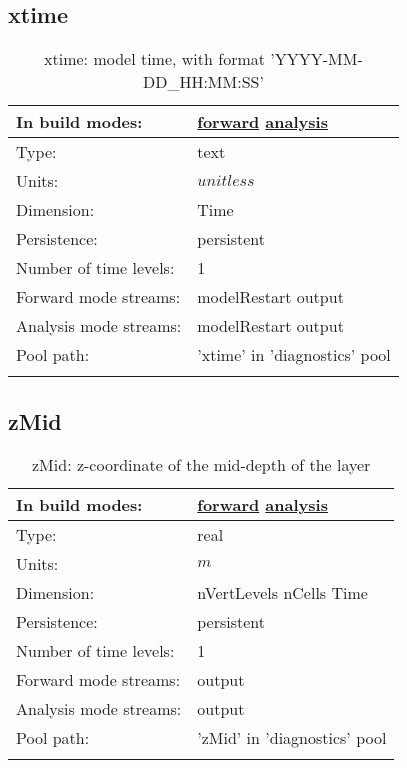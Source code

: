 \subsection[xtime]{xtime}
\label{subsec:var_sec_diagnostics_xtime}
\begin{center}
\begin{longtable}{| p{2.0in} | p{4.0in} |}
        \hline 
        In build modes: & \hyperref[subsec:forward_var_tab_diagnostics]{forward} \hyperref[subsec:analysis_var_tab_diagnostics]{analysis} \\
        \hline 
        Type: & text \\
        \hline 
        Units: & $unitless$ \\
        \hline 
        Dimension: & Time \\
        \hline 
        Persistence: & persistent \\
        \hline 
        Number of time levels: & 1 \\
        \hline 
		 Forward mode streams: &  modelRestart output \\
        \hline 
		 Analysis mode streams: &  modelRestart output \\
        \hline 
            Pool path: & 'xtime' in 'diagnostics' pool
 \\
		 \hline 
    \caption{xtime: model time, with format 'YYYY-MM-DD\_HH:MM:SS'}
\end{longtable}
\end{center}
\subsection[zMid]{zMid}
\label{subsec:var_sec_diagnostics_zMid}
\begin{center}
\begin{longtable}{| p{2.0in} | p{4.0in} |}
        \hline 
        In build modes: & \hyperref[subsec:forward_var_tab_diagnostics]{forward} \hyperref[subsec:analysis_var_tab_diagnostics]{analysis} \\
        \hline 
        Type: & real \\
        \hline 
        Units: & $m$ \\
        \hline 
        Dimension: & nVertLevels nCells Time \\
        \hline 
        Persistence: & persistent \\
        \hline 
        Number of time levels: & 1 \\
        \hline 
		 Forward mode streams: &  output \\
        \hline 
		 Analysis mode streams: &  output \\
        \hline 
            Pool path: & 'zMid' in 'diagnostics' pool
 \\
		 \hline 
    \caption{zMid: z-coordinate of the mid-depth of the layer}
\end{longtable}
\end{center}
